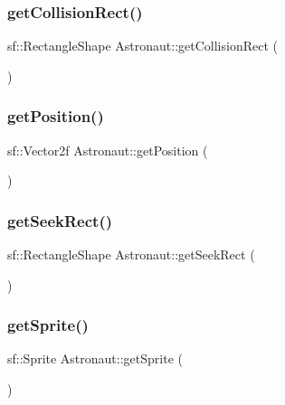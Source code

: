 \mbox{\label{class_astronaut_a5d01978fdd0f00d9adc9769505baa5d5}} 
\subsubsection{\texorpdfstring{get\+Collision\+Rect()}{getCollisionRect()}}
{\footnotesize\ttfamily sf\+::\+Rectangle\+Shape Astronaut\+::get\+Collision\+Rect (\begin{DoxyParamCaption}{ }\end{DoxyParamCaption})}

\mbox{\label{class_astronaut_a3738ff50527c44f089b110ecdb0be2f3}} 
\subsubsection{\texorpdfstring{get\+Position()}{getPosition()}}
{\footnotesize\ttfamily sf\+::\+Vector2f Astronaut\+::get\+Position (\begin{DoxyParamCaption}{ }\end{DoxyParamCaption})}

\mbox{\label{class_astronaut_a59883964bc6a7997885e341918638f80}} 
\subsubsection{\texorpdfstring{get\+Seek\+Rect()}{getSeekRect()}}
{\footnotesize\ttfamily sf\+::\+Rectangle\+Shape Astronaut\+::get\+Seek\+Rect (\begin{DoxyParamCaption}{ }\end{DoxyParamCaption})}

\mbox{\label{class_astronaut_a0fd66ca32a63fde604ddbeadd1a80edc}} 
\subsubsection{\texorpdfstring{get\+Sprite()}{getSprite()}}
{\footnotesize\ttfamily sf\+::\+Sprite Astronaut\+::get\+Sprite (\begin{DoxyParamCaption}{ }\end{DoxyParamCaption})}

